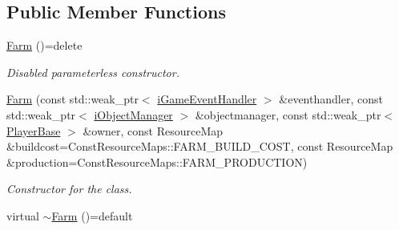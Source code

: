 \subsection*{Public Member Functions}
\begin{DoxyCompactItemize}
\item 
\hypertarget{class_course_1_1_farm_a3b92d4bdac7e8f7fd1f648bb1a4a2490}{\hyperlink{class_course_1_1_farm_a3b92d4bdac7e8f7fd1f648bb1a4a2490}{Farm} ()=delete}\label{class_course_1_1_farm_a3b92d4bdac7e8f7fd1f648bb1a4a2490}

\begin{DoxyCompactList}\small\item\em Disabled parameterless constructor. \end{DoxyCompactList}\item 
\hyperlink{class_course_1_1_farm_a14ac36a4cd1dfb9f488b6bfffe4f7baf}{Farm} (const std\-::weak\-\_\-ptr$<$ \hyperlink{class_course_1_1i_game_event_handler}{i\-Game\-Event\-Handler} $>$ \&eventhandler, const std\-::weak\-\_\-ptr$<$ \hyperlink{class_course_1_1i_object_manager}{i\-Object\-Manager} $>$ \&objectmanager, const std\-::weak\-\_\-ptr$<$ \hyperlink{class_course_1_1_player_base}{Player\-Base} $>$ \&owner, const Resource\-Map \&buildcost=Const\-Resource\-Maps\-::\-F\-A\-R\-M\-\_\-\-B\-U\-I\-L\-D\-\_\-\-C\-O\-S\-T, const Resource\-Map \&production=Const\-Resource\-Maps\-::\-F\-A\-R\-M\-\_\-\-P\-R\-O\-D\-U\-C\-T\-I\-O\-N)
\begin{DoxyCompactList}\small\item\em Constructor for the class. \end{DoxyCompactList}\item 
\hypertarget{class_course_1_1_farm_a99c06d0eeb549a04390bd260cc7ac68d}{virtual \hyperlink{class_course_1_1_farm_a99c06d0eeb549a04390bd260cc7ac68d}{$\sim$\-Farm} ()=default}\label{class_course_1_1_farm_a99c06d0eeb549a04390bd260cc7ac68d}


\end{DoxyCompactItemize}

